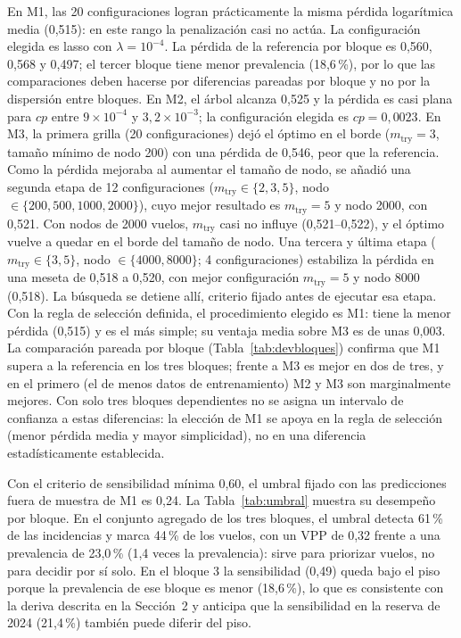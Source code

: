 \documentclass[11pt,a4paper]{article}
\begin{document}
En M1, las 20 configuraciones logran prácticamente la misma pérdida logarítmica media (0,515): en este rango la penalización casi no actúa. La configuración elegida es lasso con $\lambda=10^{-4}$. La pérdida de la referencia por bloque es 0,560, 0,568 y 0,497; el tercer bloque tiene menor prevalencia (18,6\,\%), por lo que las comparaciones deben hacerse por diferencias pareadas por bloque y no por la dispersión entre bloques. En M2, el árbol alcanza 0,525 y la pérdida es casi plana para $cp$ entre $9\times10^{-4}$ y $3{,}2\times10^{-3}$; la configuración elegida es $cp=0{,}0023$. En M3, la primera grilla (20 configuraciones) dejó el óptimo en el borde ($m_{\text{try}}=3$, tamaño mínimo de nodo 200) con una pérdida de 0,546, peor que la referencia. Como la pérdida mejoraba al aumentar el tamaño de nodo, se añadió una segunda etapa de 12 configuraciones ($m_{\text{try}}\in\{2,3,5\}$, nodo $\in\{200,500,1000,2000\}$), cuyo mejor resultado es $m_{\text{try}}=5$ y nodo 2000, con 0,521. Con nodos de 2000 vuelos, $m_{\text{try}}$ casi no influye (0,521--0,522), y el óptimo vuelve a quedar en el borde del tamaño de nodo. Una tercera y última etapa ($m_{\text{try}}\in\{3,5\}$, nodo $\in\{4000,8000\}$; 4 configuraciones) estabiliza la pérdida en una meseta de 0,518 a 0,520, con mejor configuración $m_{\text{try}}=5$ y nodo 8000 (0,518). La búsqueda se detiene allí, criterio fijado antes de ejecutar esa etapa. Con la regla de selección definida, el procedimiento elegido es M1: tiene la menor pérdida (0,515) y es el más simple; su ventaja media sobre M3 es de unas 0,003. La comparación pareada por bloque (Tabla~\ref{tab:devbloques}) confirma que M1 supera a la referencia en los tres bloques; frente a M3 es mejor en dos de tres, y en el primero (el de menos datos de entrenamiento) M2 y M3 son marginalmente mejores. Con solo tres bloques dependientes no se asigna un intervalo de confianza a estas diferencias: la elección de M1 se apoya en la regla de selección (menor pérdida media y mayor simplicidad), no en una diferencia estadísticamente establecida.
 
Con el criterio de sensibilidad mínima 0,60, el umbral fijado con las predicciones fuera de muestra de M1 es 0,24. La Tabla~\ref{tab:umbral} muestra su desempeño por bloque. En el conjunto agregado de los tres bloques, el umbral detecta 61\,\% de las incidencias y marca 44\,\% de los vuelos, con un VPP de 0,32 frente a una prevalencia de 23,0\,\% (1,4 veces la prevalencia): sirve para priorizar vuelos, no para decidir por sí solo. En el bloque 3 la sensibilidad (0,49) queda bajo el piso porque la prevalencia de ese bloque es menor (18,6\,\%), lo que es consistente con la deriva descrita en la Sección~2 y anticipa que la sensibilidad en la reserva de 2024 (21,4\,\%) también puede diferir del piso.
 
\end{document}
